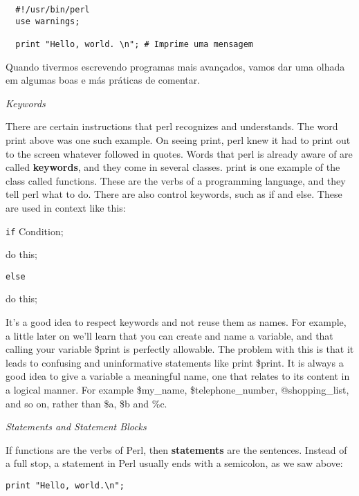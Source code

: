 \documentclass[a4paper,12pt,twoside]{book}
\begin{document}
\begin{lstlisting}
  #!/usr/bin/perl
  use warnings;

  print "Hello, world. \n"; # Imprime uma mensagem
\end{lstlisting}

\noindent Quando tivermos escrevendo programas mais avançados, vamos 
dar uma olhada em algumas boas e más práticas de comentar.\medskip

\noindent \textit{Keywords}

\noindent There are certain instructions that perl recognizes and understands.
The word print above was one such example. On seeing print, perl knew it had 
to print out to the screen whatever followed in quotes. Words that perl is 
already aware of are called \textbf{keywords}, and they come in several 
classes. print is one example of the class called functions. These are 
the verbs of a programming language, and they tell perl what to do. 
There are also control keywords, such as if and else. These are used in 
context like this:\medskip

\noindent 

\noindent \texttt{if} Condition;

\noindent do this;

\noindent 

\noindent \texttt{else}

\noindent do this;

\noindent 

\noindent It's a good idea to respect keywords and not reuse them as names. 
For example, a little later on we'll learn that you can create and name a 
variable, and that calling your variable \$print is perfectly allowable. 
The problem with this is that it leads to confusing and uninformative 
statements like print \$print. It is always a good idea to give a variable 
a meaningful name, one that relates to its content in a logical manner. 
For example \$my\_name, \$telephone\_number, @shopping\_list, and so on, 
rather than \$a, \$b and \%c.\medskip

\noindent 

\noindent \textit{Statements and Statement Blocks}

\noindent If functions are the verbs of Perl, then \textbf{statements }are 
the sentences. Instead of a full stop, a statement in Perl usually ends 
with a semicolon, as we saw above:\medskip

\noindent 

\noindent \texttt{print "Hello, world.\textbackslash n";}
\end{document}
